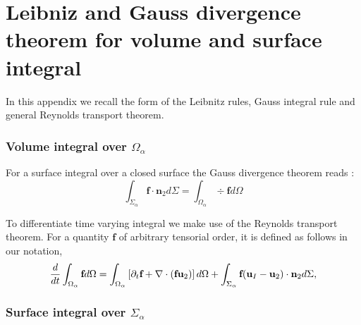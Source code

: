 \section{Leibniz and Gauss divergence theorem for volume and surface integral}
\label{ap:math}

In this appendix we recall the form of the Leibnitz rules, Gauss integral rule and general Reynolds transport theorem. 
\subsubsection*{Volume integral over $\Omega_\alpha$}
For a surface integral over a closed surface the Gauss divergence theorem reads : 
\begin{equation}
    \int_{\Sigma_\alpha} \textbf{f} \cdot \textbf{n}_2 d\Sigma
    = \int_{\Omega_\alpha} \div \textbf{f}d\Omega
\end{equation}

To differentiate time varying integral we make use of the Reynolds transport theorem.
For a quantity $\textbf{f}$ of arbitrary tensorial order, it is defined  as follows in our notation, 
\begin{equation}
    \frac{d}{dt} \int_{\Omega_\alpha} \textbf{f} d\Omega
    = \int_{\Omega_\alpha}\left[\partial_t \textbf{f} + \mathbf{\nabla}\cdot\left(\textbf{f}\textbf{u}_2\right) \right]d\Omega\\
    + \int_{\Sigma_\alpha} \textbf{f} (\textbf{u}_I-\textbf{u}_2)\cdot \textbf{n}_2 d\Sigma,
    \label{eq:Reynolds}
\end{equation}


\subsubsection*{Surface integral over $\Sigma_\alpha$}

